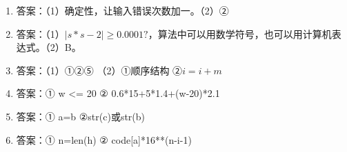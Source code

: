 \begin{enumerate}
\item 答案：（1）确定性，让输入错误次数加一。（2）②

\item 答案：（1）$|s * s - 2| \ge 0.0001?$，算法中可以用数学符号，也可以用计算机表达式。（2）B。

\item 答案：（1）①②⑤ （2）①顺序结构 ②$i=i+m$

\item 答案：① w <= 20 ② 0.6*15+5*1.4+(w-20)*2.1

\item 答案：① a=b ②str(c)或str(b)

\item 答案：① n=len(h) ② code[a]*16**(n-i-1)


\end{enumerate}
